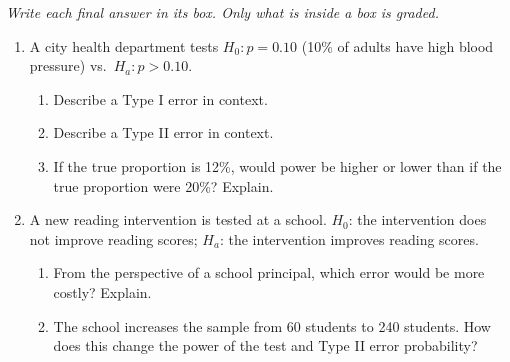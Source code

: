 \documentclass[10pt]{article}
\begin{document}
{\small\itshape Write each final answer in its box. Only what is inside a box is graded.}\par

\vspace{0.15in}

\begin{enumerate}

  \item A city health department tests $H_0: p = 0.10$ (10\% of adults have high blood
        pressure) vs.\ $H_a: p > 0.10$.
        \begin{enumerate}[label=\alph*.]
          \item Describe a Type I error in context. 
          \item Describe a Type II error in context. 
          \item If the true proportion is 12\%, would power be higher or lower than if
                the true proportion were 20\%? Explain. 
        \end{enumerate}

  \newpage
  \item A new reading intervention is tested at a school. $H_0$: the intervention does not
        improve reading scores; $H_a$: the intervention improves reading scores.
        \begin{enumerate}[label=\alph*.]
          \item From the perspective of a school principal, which error would be more
                costly? Explain. 
          \item The school increases the sample from 60 students to 240 students. How
                does this change the power of the test and Type II error probability? 
        \end{enumerate}


\end{enumerate}
\end{document}
